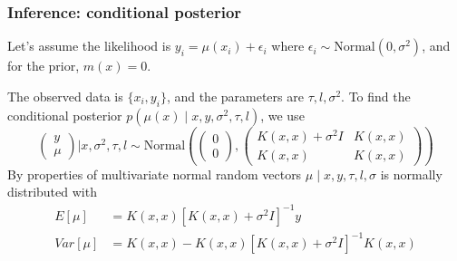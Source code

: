 \documentclass{beamer}
\begin{document}
\begin{frame}
\frametitle{Inference: conditional posterior}


Let's assume the likelihood is $y_i = \mu(x_i) + \epsilon_i$ where $\epsilon_i \sim \text{Normal}(0,\sigma^2)$, and for the prior, $m(x) = 0$. 
\newline

The observed data is $\{x_i,y_i\}$, and the parameters are $\tau, l, \sigma^2$. To find the conditional posterior $p(\mu(x) \mid x,y,\sigma^2, \tau, l)$, we use
$$
\left(\begin{array}{c}
y \\
\mu
\end{array}\right) 
\bigg\rvert x, \sigma^2, \tau, l
\sim \text{Normal}\left(
\left(\begin{array}{c}
0\\
0
\end{array}\right),
\left(\begin{array}{cc}
K(x,x) + \sigma^2 I & K(x,x)\\
K(x,x) & K(x,x)
\end{array}\right)
\right)
$$
By properties of multivariate normal random vectors $\mu \mid x, y, \tau, l, \sigma$ is normally distributed with
\begin{align*}
E[\mu] &= K(x, x) [K(x,x) + \sigma^2 I]^{-1} y \\
Var[\mu] &= K(x, x) - K(x, x)[K(x,x) + \sigma^2 I]^{-1} K(x,x)
\end{align*}

\end{frame}
\end{document}
